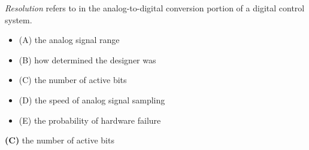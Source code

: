 

{\it Resolution} refers to \underbar{\hskip 50pt} in the analog-to-digital conversion portion of a digital control system.

\begin{itemize}
\item{(A)} the analog signal range
\vskip 5pt 
\item{(B)} how determined the designer was 
\vskip 5pt 
\item{(C)} the number of active bits
\vskip 5pt 
\item{(D)} the speed of analog signal sampling
\vskip 5pt 
\item{(E)} the probability of hardware failure 
\end{itemize}







{\bf (C)} the number of active bits
 










